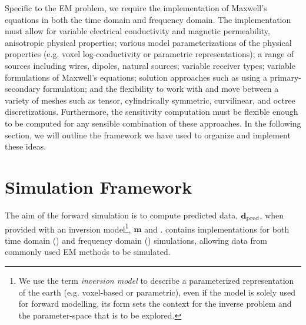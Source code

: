Specific to the EM problem, we require the implementation of Maxwell's
equations in both the time domain and frequency domain. The implementation
must allow for variable electrical conductivity and magnetic permeability,
anisotropic physical properties; various model parameterizations of the
physical properties (e.g. voxel  log-conductivity or parametric
representations); a range of sources including wires, dipoles, natural
sources; variable receiver types; variable formulations of Maxwell's
equations; solution approaches such as using a primary-secondary formulation; and the flexibility
to work with and move between a variety of meshes such as tensor,
cylindrically symmetric, curvilinear, and octree discretizations. Furthermore,
the sensitivity computation must be flexible enough to be computed for any
sensible combination of these approaches. In the following section, we will
outline the framework we have used to organize and implement these ideas.



\section{Simulation Framework}
\label{sec:Implementation}

The aim of the forward simulation is to compute predicted data, $\mathbf{d}_\text{pred}$,
when provided with an inversion model\footnote{We use the term \emph{inversion model}
to describe a parameterized representation of the earth (e.g. voxel-based or
parametric), even if the model is solely used for forward modelling, its form
sets the context for the inverse problem and the parameter-space that is to be
explored.}, $\mathbf{m}$ and \Sources. \simpegEM contains implementations for
both time domain (\TDEM) and frequency domain (\FDEM) simulations, allowing
data from commonly used EM methods to be simulated.

